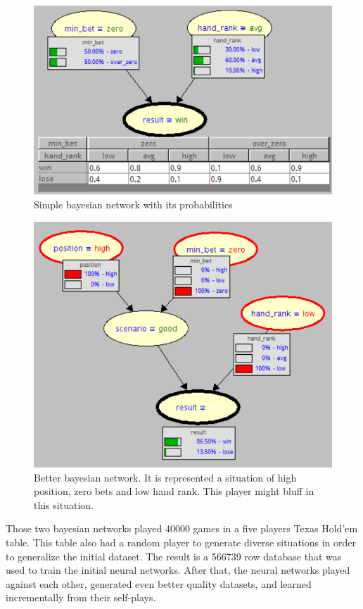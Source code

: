 \begin{figure}[H]
  \centering
  \includegraphics[width=1\textwidth]{simple_bn}
  \caption{Simple bayesian network with its probabilities}
  \label{fig:simple-bn}
\end{figure}

\begin{figure}[H]
  \centering
  \includegraphics[width=1\textwidth]{best_bn}
  \caption{Better bayesian network. It is represented a situation of high position, zero bets and low hand rank. This player might bluff in this situation.}
\end{figure}
\vspace{0.5cm}

Those two bayesian networks played 40000 games in a five players Texas Hold'em table. This table also had a random player to generate diverse situations in order to generalize the initial dataset. The result is a 566739 row database that was used to train the initial neural networks. After that, the neural networks played against each other, generated even better quality datasets, and learned incrementally from their self-plays.


